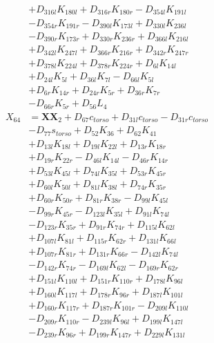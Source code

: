\begin{multicols}{2}
\begin{align}
&+ D_{316l}K_{180l} + D_{316r}K_{180r} - D_{354l}K_{191l}  \nonumber \\
&- D_{354r}K_{191r} - D_{390l}K_{173l} + D_{330l}K_{236l}  \nonumber \\
&- D_{390r}K_{173r} + D_{330r}K_{236r} + D_{366l}K_{216l}  \nonumber \\
&+ D_{342l}K_{247l} + D_{366r}K_{216r} + D_{342r}K_{247r}  \nonumber \\
&+ D_{378l}K_{224l} + D_{378r}K_{224r} + D_{6l}K_{14l}  \nonumber \\
&+ D_{24l}K_{5l} + D_{36l}K_{7l} - D_{66l}K_{5l}  \nonumber \\
&+ D_{6r}K_{14r} + D_{24r}K_{5r} + D_{36r}K_{7r}  \nonumber \\
&- D_{66r}K_{5r} + D_{56}L_4 \nonumber \\
X_{64} &= \mathbf{XX}_2 + D_{67}c_{torso} + D_{31l}c_{torso} - D_{31r}c_{torso}  \nonumber \\
&- D_{77}s_{torso} + D_{52}K_{36} + D_{62}K_{41}  \nonumber \\
&+ D_{13l}K_{18l} + D_{19l}K_{22l} + D_{13r}K_{18r}  \nonumber \\
&+ D_{19r}K_{22r} - D_{46l}K_{14l} - D_{46r}K_{14r}  \nonumber \\
&+ D_{53l}K_{45l} + D_{74l}K_{35l} + D_{53r}K_{45r}  \nonumber \\
&+ D_{60l}K_{50l} + D_{81l}K_{38l} + D_{74r}K_{35r}  \nonumber \\
&+ D_{60r}K_{50r} + D_{81r}K_{38r} - D_{99l}K_{45l}  \nonumber \\
&- D_{99r}K_{45r} - D_{123l}K_{35l} + D_{91l}K_{74l}  \nonumber \\
&- D_{123r}K_{35r} + D_{91r}K_{74r} + D_{115l}K_{62l}  \nonumber \\
&+ D_{107l}K_{81l} + D_{115r}K_{62r} + D_{131l}K_{66l}  \nonumber \\
&+ D_{107r}K_{81r} + D_{131r}K_{66r} - D_{142l}K_{74l}  \nonumber \\
&- D_{142r}K_{74r} - D_{169l}K_{62l} - D_{169r}K_{62r}  \nonumber \\
&+ D_{151l}K_{110l} + D_{151r}K_{110r} + D_{178l}K_{96l}  \nonumber \\
&+ D_{160l}K_{117l} + D_{178r}K_{96r} + D_{187l}K_{101l}  \nonumber \\
&+ D_{160r}K_{117r} + D_{187r}K_{101r} - D_{209l}K_{110l}  \nonumber \\
&- D_{209r}K_{110r} - D_{239l}K_{96l} + D_{199l}K_{147l}  \nonumber \\
&- D_{239r}K_{96r} + D_{199r}K_{147r} + D_{229l}K_{131l}  \nonumber \\

\end{align}
\end{multicols}
